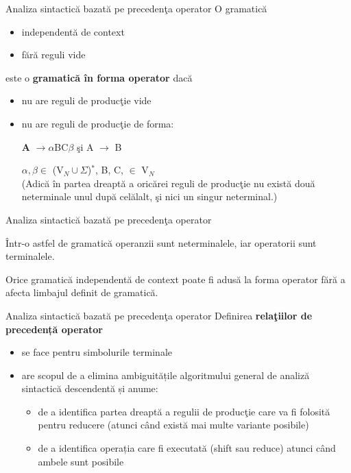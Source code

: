 \documentclass[pdf]{beamer}
\begin{document}
\begin{frame}{Analiza sintactică bazată pe precedenţa operator}
O gramatică
\begin{itemize}
\item
independentă de context
\item
fără reguli vide
\end{itemize}
este o \textbf{gramatică în forma operator} dacă 
\begin{itemize}
\item
nu are reguli de producţie vide
\item
nu are reguli de producţie de forma:

\begin{center}
\textbf A $\to \alpha$BC$\beta$ şi A $\to$ B
\end{center} 
$\alpha, \beta \in$ (V$_{N}\cup\Sigma$)$^{*}$, B, C, $\in$ V$_{N}$ \\

(Adică în partea dreaptă a oricărei reguli de producţie nu există două neterminale unul după celălalt, şi nici un singur neterminal.)
\end{itemize}
\end{frame}



\begin{frame}{Analiza sintactică bazată pe precedenţa operator}

Într-o astfel de gramatică operanzii sunt neterminalele, iar operatorii sunt terminalele.
\newline

Orice gramatică independentă de context poate fi adusă la forma operator fără a afecta limbajul definit de gramatică.
\end{frame}



\begin{frame}{Analiza sintactică bazată pe precedenţa operator}
Definirea \textbf{relaţiilor de precedență operator}
\begin{itemize}
\item
se face pentru simbolurile terminale
\item
are scopul de a elimina ambiguitățile algoritmului general de analiză sintactică descendentă și anume:
\begin{itemize}
\item
de a identifica partea dreaptă a regulii de producţie care va fi folosită pentru reducere (atunci când există mai multe variante posibile)
\item
de a identifica operația care fi executată (shift sau reduce) atunci când ambele sunt posibile
\end{itemize}
\end{itemize}
\end{frame}
\end{document}
